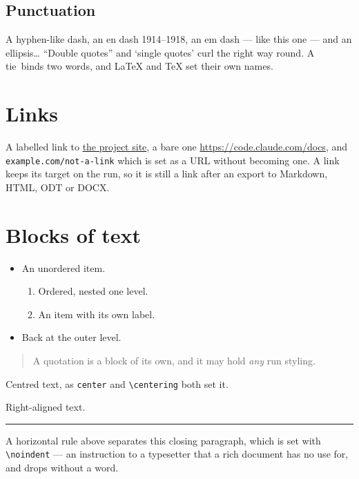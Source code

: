 \documentclass[11pt]{article}
\begin{document}
\subsection{Punctuation}
A hyphen-like dash, an en dash 1914--1918, an em dash --- like this one ---
and an ellipsis\ldots{} ``Double quotes'' and `single quotes' curl the right
way round. A tie~binds two words, and \LaTeX{} and \TeX{} set their own
names.

\section{Links}
A labelled link to \href{https://ultra-os.org}{the project site}, a bare one
\url{https://code.claude.com/docs}, and \nolinkurl{example.com/not-a-link}
which is set as a URL without becoming one. A link keeps its target on the
run, so it is still a link after an export to Markdown, HTML, ODT or DOCX.

\section{Blocks of text}
\begin{itemize}
  \item An unordered item.
  \begin{enumerate}
    \item Ordered, nested one level.
    \item[(b)] An item with its own label.
  \end{enumerate}
  \item Back at the outer level.
\end{itemize}

\begin{quote}
A quotation is a block of its own, and it may hold \emph{any} run styling.
\end{quote}

\begin{center}
Centred text, as \texttt{center} and \texttt{\textbackslash centering} both
set it.
\end{center}

\begin{flushright}
Right-aligned text.
\end{flushright}

\hrule
\medskip
\noindent A horizontal rule above separates this closing paragraph, which is
set with \texttt{\textbackslash noindent} --- an instruction to a typesetter
that a rich document has no use for, and drops without a word.
\end{document}

